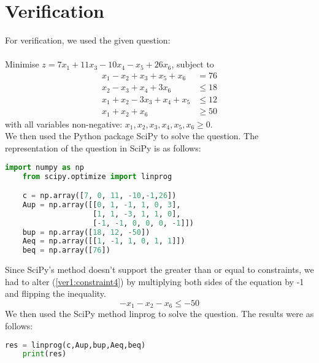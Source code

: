 \documentclass{article}
\numberwithin{equation}{section}
\begin{document}
\section{Verification}
For verification, we used the given question: \\ \\
Minimise $z = 7x_1 + 11x_3 - 10x_4 - x_5 + 26x_6$, subject to
\begin{align}
    x_1 - x_2 + x_3 + x_5 + x_6 &= 76 \label{ver1:constraint1} \\
    x_2 - x_3 + x_4 + 3x_6 &\leq 18 \label{ver1:constraint2} \\
    x_1 + x_2 - 3x_3 + x_4 + x_5 &\leq 12 \label{ver1:constraint3} \\
    x_1 + x_2 + x_6 &\geq 50 \label{ver1:constraint4}
\end{align}
with all variables non-negative: $x_1, x_2, x_3, x_4, x_5, x_6 \geq 0$. \\ 
We then used the Python package SciPy to solve the question. The representation of the question in SciPy is as follows:
\begin{lstlisting}[language=Python, basicstyle=\scriptsize, frame=single]
    import numpy as np
    from scipy.optimize import linprog

    c = np.array([7, 0, 11, -10,-1,26])
    Aup = np.array([[0, 1, -1, 1, 0, 3],
                    [1, 1, -3, 1, 1, 0],
                    [-1, -1, 0, 0, 0, -1]])
    bup = np.array([18, 12, -50])
    Aeq = np.array([[1, -1, 1, 0, 1, 1]])
    beq = np.array([76])
\end{lstlisting}
Since SciPy's method doesn't support the greater than or equal to constraints, we had to alter (\ref{ver1:constraint4}) by multiplying both sides of the equation by -1 and flipping the inequality. 
\begin{equation}
    -x_1 - x_2 - x_6 \leq -50
\end{equation}
We then used the SciPy method linprog to solve the question. The results were as follows:
\begin{lstlisting}[language=Python, basicstyle=\scriptsize, frame=single]
    res = linprog(c,Aup,bup,Aeq,beq)
    print(res)
\end{lstlisting}
\end{document}
